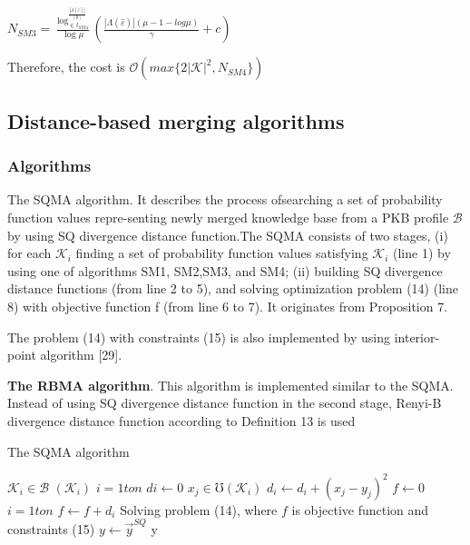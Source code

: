 \documentclass[]{iosart2c}
\begin{document}
$N_{SM3} = \frac{\log^{\frac{|\Lambda(\hat{\varepsilon})|}{(0)}}_{\in t_{SM4}}}{\log\mu} \left( \frac{ |\Lambda(\hat{\varepsilon})| (\mu - 1 - log\mu)}{\gamma} + c\right)$

Therefore, the cost is $\mathcal{O}(max\{2 |\mathcal{K}|^2 ,N_{SM4}\})$

\subsection{Distance-based merging algorithms}

\subsubsection{Algorithms}

The SQMA algorithm. It describes the process ofsearching a set of probability function values repre-senting newly merged knowledge base from a PKB 
profile $\mathcal{B}$ by using SQ divergence distance function.The SQMA consists of two stages, (i) for each $\mathcal{K}_i$
finding a set of probability function values satisfying $\mathcal{K}_i$ (line 1) by using one of algorithms SM1, SM2,SM3, and SM4; (ii) building SQ divergence distance
functions (from line 2 to 5), and solving optimization problem (14) (line 8) with objective function f (from line 6 to 7). It originates from Proposition 7.

The problem (14) with constraints (15) is also
implemented by using interior-point algorithm [29].

\textbf{The RBMA algorithm}. This algorithm is implemented
similar to the SQMA. Instead of using SQ
divergence distance function in the second stage,
Renyi-B divergence distance function according to
Definition 13 is used

\begin{algorithm}
\caption{The SQMA algorithm}
\begin{algorithmic}[1]
\For $\mathcal{K}_i \in \mathcal{B}$
  \State $(\mathcal{K}_i )$
\EndFor
\For $i=1 to n$
  \State $di \gets 0$
  \For $x_j \in \mho(\mathcal{K}_i)$
    \State $d_i \gets d_i + (x_j - y_j)^2$
  \EndFor
\EndFor
\State $f \gets 0$
\For $i=1 to n$
  \State $f \gets f + d_i$
\EndFor
\State Solving problem (14), where $f$ is objective function and
constraints (15)
\State $y \gets \vec{y}^{SQ}$
\State \Return y
\end{algorithmic}
\end{algorithm}
\end{document}
